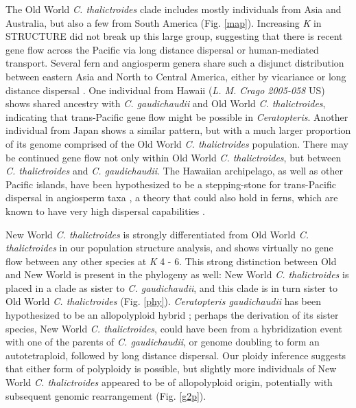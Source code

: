 \documentclass[12pt]{article}
\begin{document}
\begin{flushleft}
The Old World \textit{C. thalictroides} clade includes mostly individuals from Asia and Australia, but also a few from South America (Fig. \ref{map}). Increasing \textit{K} in {\small{STRUCTURE}} did not break up this large group, suggesting that there is recent gene flow across the Pacific via long distance dispersal or human-mediated transport. Several fern and angiosperm genera share such a disjunct distribution between eastern Asia and North to Central America, either by vicariance or long distance dispersal \autocite{Kato1983, Les2003}. One individual from Hawaii (\textit{L. M. Crago 2005-058} US) shows shared ancestry with \textit{C. gaudichaudii} and Old World \textit{C. thalictroides}, indicating that trans-Pacific gene flow might be possible in \textit{Ceratopteris}. Another individual from Japan shows a similar pattern, but with a much larger proportion of its genome comprised of the Old World \textit{C. thalictroides} population. There may be continued gene flow not only within Old World \textit{C. thalictroides}, but between \textit{C. thalictroides} and \textit{C. gaudichaudii}. The Hawaiian archipelago, as well as other Pacific islands, have been hypothesized to be a stepping-stone for trans-Pacific dispersal in angiosperm taxa \autocite{Harbaugh2009, Wright2001}, a theory that could also hold in ferns, which are known to have very high dispersal capabilities \autocite{Barrington1993, Tryon1970}. 

New World \textit{C. thalictroides} is strongly differentiated from Old World \textit{C. thalictroides} in our population structure analysis, and shows virtually no gene flow between any other species at \textit{K} 4 - 6. This strong distinction between Old and New World is present in the phylogeny as well: New World \textit{C. thalictroides} is placed in a clade as sister to \textit{C. gaudichaudii}, and this clade is in turn sister to Old World \textit{C. thalictroides} (Fig. \ref{phy}). \textit{Ceratopteris gaudichaudii} has been hypothesized to be an allopolyploid hybrid \autocite{Adjie2007}; perhaps the derivation of its sister species, New World \textit{C. thalictroides}, could have been from a hybridization event with one of the parents of \textit{C. gaudichaudii}, or genome doubling to form an autotetraploid, followed by long distance dispersal. Our ploidy inference suggests that either form of polyploidy is possible, but slightly more individuals of New World \textit{C. thalictroides} appeared to be of allopolyploid origin, potentially with subsequent genomic rearrangement (Fig. \ref{g2p}).


\end{flushleft}
\end{document}
